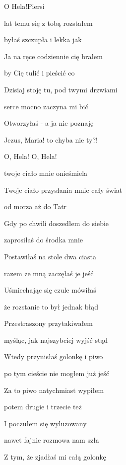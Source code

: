 \begin{song}{O Hela!}{}{}{Piersi}{}{}
  \begin{SBVerse}
     lat temu się z tobą rozstałem

    byłaś szczupła i lekka jak 

    Ja na ręce codziennie cię brałem

    by Cię tulić i pieścić co 
  \end{SBVerse}
  \begin{SBVerse}
    Dzisiaj stoję tu, pod twymi drzwiami

    serce mocno zaczyna mi bić

    Otworzyłaś - a ja nie poznaję

    Jezus, Maria! to chyba nie ty?!
  \end{SBVerse}
  \begin{SBChorus}
    O, Hela! O, Hela!

    twoje ciało mnie onieśmiela

    Twoje ciało przysłania mnie cały świat

    od morza aż do Tatr
  \end{SBChorus}
  \begin{SBVerse}
    Gdy po chwili doszedłem do siebie

    zaprosiłaś do środka mnie

    Postawiłaś na stole dwa ciasta

    razem ze mną zaczęłaś je jeść
  \end{SBVerse}
  \begin{SBVerse}
    Uśmiechając się czule mówiłaś

    że rozstanie to był jednak błąd

    Przestraszony przytakiwałem

    myśląc, jak najszybciej wyjść stąd
  \end{SBVerse}
  \begin{SBVerse}
    Wtedy przynisłaś golonkę i piwo

    po tym cieście nie mogłem już jeść

    Za to piwo natychmiast wypiłem

    potem drugie i trzecie też
  \end{SBVerse}
  \begin{SBVerse}
    I poczułem się wyluzowany

    nawet fajnie rozmowa nam szła

    Z tym, że zjadłaś mi całą golonkę


\end{SBVerse}
\end{song}

